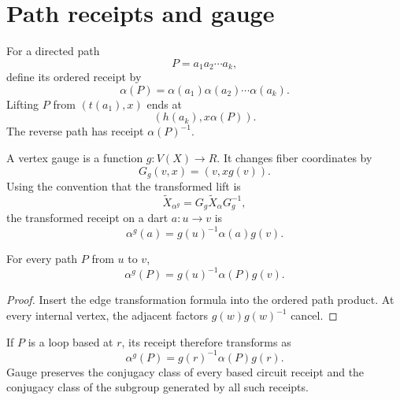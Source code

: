 \section{Path receipts and gauge}

For a directed path
\[
P=a_1a_2\cdots a_k,
\]
define its ordered receipt by
\[
\alpha(P)=\alpha(a_1)\alpha(a_2)\cdots\alpha(a_k).
\]
Lifting $P$ from $(t(a_1),x)$ ends at
\[
(h(a_k),x\alpha(P)).
\]
The reverse path has receipt $\alpha(P)^{-1}$.

A vertex gauge is a function $g:V(X)\to R$. It changes fiber coordinates by
\[
G_g(v,x)=(v,xg(v)).
\]
Using the convention that the transformed lift is
\[
\widetilde X_{\alpha^g}=G_g\widetilde X_{\alpha}G_g^{-1},
\]
the transformed receipt on a dart $a:u\to v$ is
\[
\alpha^g(a)=g(u)^{-1}\alpha(a)g(v).
\]

\begin{lemma}
For every path $P$ from $u$ to $v$,
\[
\alpha^g(P)=g(u)^{-1}\alpha(P)g(v).
\]
\end{lemma}

\begin{proof}
Insert the edge transformation formula into the ordered path product. At
every internal vertex, the adjacent factors $g(w)g(w)^{-1}$ cancel.
\end{proof}

If $P$ is a loop based at $r$, its receipt therefore transforms as
\[
\alpha^g(P)=g(r)^{-1}\alpha(P)g(r).
\]
Gauge preserves the conjugacy class of every based circuit receipt and the
conjugacy class of the subgroup generated by all such receipts.

